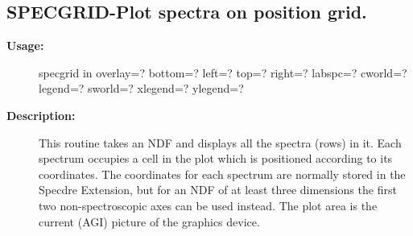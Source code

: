 \subsection{SPECGRID-\label{SPECGRID}Plot spectra on position grid.}
\begin{description}

\item [{\bf Usage:}]

   specgrid in overlay=? bottom=? left=? top=? right=?
      labspc=? cworld=? legend=? sworld=? xlegend=? ylegend=?


\item [{\bf Description:}]
   This routine takes an NDF and displays all the spectra (rows) in
   it. Each spectrum occupies a cell in the plot which is positioned
   according to its coordinates. The coordinates for each spectrum
   are normally stored in the Specdre Extension, but for an NDF of at
   least three dimensions the first two non-spectroscopic axes can be
   used instead. The plot area is the current (AGI) picture of the
   graphics device.



\end{description}
